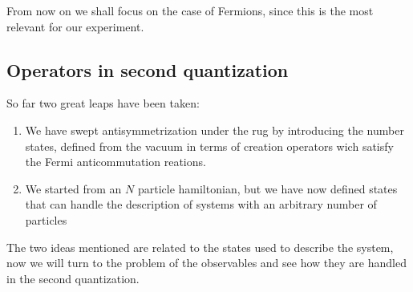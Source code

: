 \documentclass[oneside,11pt]{memoir}
\begin{document}
From now on we shall focus on the case of Fermions, since this is the most
relevant for our experiment.  

\subsection{Operators in second quantization}

So far two great leaps have been taken: 
\begin{enumerate}
 \item We have swept antisymmetrization under the rug by introducing the number
states, defined from the vacuum in terms of creation operators wich satisfy the
Fermi anticommutation reations.  
 \item We started from an $N$ particle hamiltonian, but we have now defined
states that can handle the description of systems with an arbitrary number of
particles 
\end{enumerate}
The two ideas mentioned are related to the states used to describe the system,
now we will turn to the problem of the observables and see how they are handled
in the second quantization.  
\end{document}
